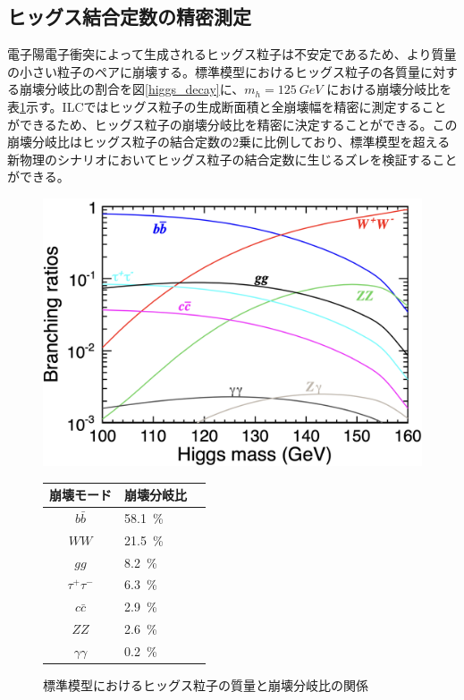 \subsection{ヒッグス結合定数の精密測定}
電子陽電子衝突によって生成されるヒッグス粒子は不安定であるため、より質量の小さい粒子のペアに崩壊する。標準模型におけるヒッグス粒子の各質量に対する崩壊分岐比の割合を図\ref{higgs_decay}に、$m_h = \SI{125}{GeV}$ における崩壊分岐比を表\ref{HiggsDecayonILC}示す。ILCではヒッグス粒子の生成断面積と全崩壊幅を精密に測定することができるため、ヒッグス粒子の崩壊分岐比を精密に決定することができる。この崩壊分岐比はヒッグス粒子の結合定数の2乗に比例しており、標準模型を超える新物理のシナリオにおいてヒッグス粒子の結合定数に生じるズレを検証することができる。
\begin{figure}[H]
 \begin{minipage}[h]{.45\linewidth}
	\begin{center}
 \includegraphics[keepaspectratio, scale=0.2]
 	{Figure/Introduction/higgs_decay.png}
 	\caption{標準模型におけるヒッグス粒子の質量と崩壊分岐比の関係}
 	\label{higgs_decay}
	\end{center}
 \end{minipage}
 \hfill
\begin{minipage}[ht]{.45\linewidth}
 \centering
  \begin{tabular}{clc}
   \hline
   崩壊モード & 崩壊分岐比\\
   \hline \hline
   $b\bar{b}$ & 58.1\, \%\\
   $WW$ & 21.5\, \%\\
   $gg$ & 8.2\, \%\\
   ${\tau}^+ {\tau}^-$ & 6.3\, \%\\
   $c \bar{c}$ & 2.9\, \%\\
   $ZZ$ & 2.6\, \%\\
   $\gamma \gamma$ & 0.2\, \%\\
   \hline
  \end{tabular}
  \label{HiggsDecayonILC}
 \end{minipage}
 \end{figure}

